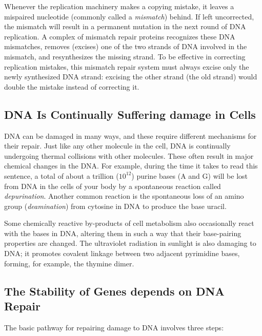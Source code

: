 Whenever the replication machinery makes a copying mistake, it leaves
a mispaired nucleotide (commonly called a \textit{mismatch}) behind. If left
uncorrected, the mismatch will result in a permanent mutation in the
next round of DNA replication. A complex of mismatch
repair proteins recognizes these DNA mismatches, removes (excises) one
of the two strands of DNA involved in the mismatch, and resynthesizes
the missing strand. To be effective in correcting replication
mistakes, this mismatch repair system must always excise only the newly
synthesized DNA strand: excising the other strand (the old strand) would
double the mistake instead of correcting it.

\subsection{DNA Is Continually Suffering damage in Cells}
DNA can be damaged in many ways, and these require different mechanisms for their repair. Just
like any other molecule in the cell, DNA is continually undergoing thermal collisions with other molecules. These often result in major chemical
changes in the DNA. For example, during the time it takes to read this
sentence, a total of about a trillion ($10^{12}$) purine bases (A and G) will be
lost from DNA in the cells of your body by a spontaneous reaction called
\textit{depurination}.
Another common reaction is the spontaneous loss of an amino
group (\textit{deamination}) from cytosine in DNA to produce the base uracil.

Some chemically reactive by-products of cell metabolism
also occasionally react with the bases in DNA, altering them in such a
way that their base-pairing properties are changed. The ultraviolet radiation
in sunlight is also damaging to DNA; it promotes covalent linkage
between two adjacent pyrimidine bases, forming, for example, the thymine dimer.

\subsection{The Stability of Genes depends on DNA Repair}

The basic pathway for repairing damage to DNA involves three steps:

